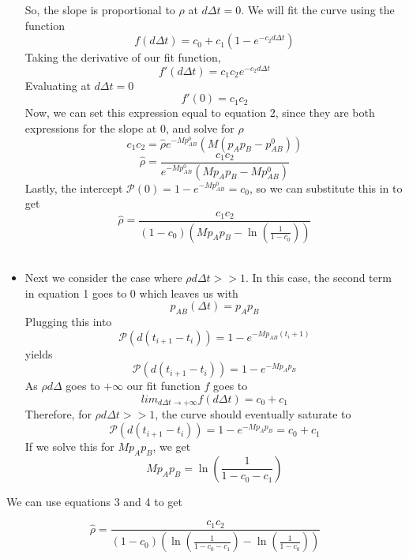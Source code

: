 \documentclass[12pt]{article}
\begin{document}
\begin{itemize}
So, the slope is proportional to $\rho$ at $d \Delta t = 0$. We will fit the curve using the function
\[f(d\Delta t) = c_0 + c_1(1-e^{-c_2d\Delta t})\]
Taking the derivative of our fit function,
\[f'(d\Delta t) = c_1c_2e^{-c_2d\Delta t}\]
Evaluating at $d \Delta t = 0$
\[f'(0) = c_1c_2\]
Now, we can set this expression equal to equation 2, since they are both expressions for the slope at 0, and solve for $\rho$
\[c_1c_2 = \hat{\rho} e^{-Mp_{AB}^0}(M(p_Ap_B - p_{AB}^0))\]
\[\hat{\rho} = \frac{c_1c_2}{e^{-Mp_{AB}^0}(Mp_Ap_B - Mp_{AB}^0)}\]
Lastly, the intercept $\mathcal{P}(0) = 1 - e^{-Mp_{AB}^0} = c_0$, so we can substitute this in to get
\begin{equation}\hat{\rho} = \frac{c_1c_2}{(1-c_0)\left(Mp_Ap_B  - \ln\left(\frac{1}{1- c_0}\right)\right)}\end{equation}
\\
\item Next we consider the case where $\rho d \Delta t >> 1$.
In this case, the second term in equation 1 goes to 0 which leaves us with
\[p_{AB}(\Delta t) = p_A p_B\]
Plugging this into 
\[\mathcal{P}(d(t_{i+1}-t_i)) = 1 - e^{-Mp_{AB}{(t_i + 1)}}\]
yields 
\[\mathcal{P}(d(t_{i+1}-t_i)) = 1 - e^{-Mp_Ap_B}\]
As $\rho d \Delta$ goes to $+\infty$ our fit function $f$ goes to 
\[lim_{d \Delta t \rightarrow +\infty}f(d\Delta t) = c_0 + c_1\]
Therefore, for $\rho d \Delta t >> 1$, the curve should eventually saturate to 
\[\mathcal{P}(d(t_{i+1}-t_i)) = 1 - e^{-Mp_Ap_B} =  c_0 + c_1\]
If we solve this for $Mp_Ap_B$, we get
\begin{equation}Mp_Ap_B =  \ln \left(\frac{1}{1 - c_0 - c_1}\right)\end{equation}
\end{itemize}

We can use equations 3 and 4 to get

\[\hat{\rho} = \frac{c_1c_2}{(1-c_0)\left( \ln \left(\frac{1}{1 - c_0 - c_1}\right) - \ln\left(\frac{1}{1- c_0}\right)\right)}\]
\end{document}
